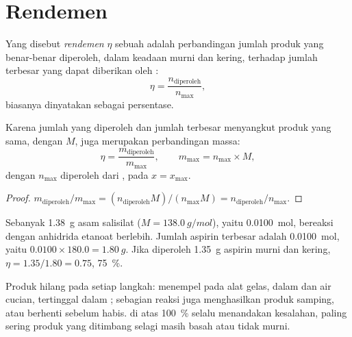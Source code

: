 \section{Rendemen}

\begin{definition}[Rendemen]\label{def:g10:synthesis-yield:yield}
Yang disebut \emph{rendemen} $\eta$ sebuah 
adalah perbandingan jumlah produk yang benar-benar diperoleh, dalam
keadaan murni dan kering, terhadap jumlah terbesar yang dapat diberikan
oleh :
\[
  \eta = \frac{n_{\text{diperoleh}}}{n_{\max}} ,
\]
biasanya dinyatakan sebagai persentase.
\end{definition}

\begin{proposition}\label{prop:g10:synthesis-yield:masses}
Karena jumlah yang diperoleh dan jumlah terbesar menyangkut produk yang
sama, dengan  $M$,  juga merupakan perbandingan
massa:
\[
  \eta = \frac{m_{\text{diperoleh}}}{m_{\max}},
  \qquad m_{\max} = n_{\max} \times M,
\]
dengan $n_{\max}$ diperoleh dari , pada $x = x_{\max}$.
\end{proposition}

\begin{proof}
$m_{\text{diperoleh}} / m_{\max} = (n_{\text{diperoleh}} M) / (n_{\max} M)
= n_{\text{diperoleh}} / n_{\max}$.
\end{proof}

\begin{example}\label{ex:g10:synthesis-yield:small}
Sebanyak \qty{1.38}{g} asam salisilat ($M = \qty{138.0}{g/mol}$), yaitu
\qty{0.0100}{mol}, bereaksi dengan anhidrida etanoat berlebih. Jumlah
aspirin terbesar adalah \qty{0.0100}{mol}, yaitu
$0.0100 \times 180.0 = \qty{1.80}{g}$. Jika diperoleh \qty{1.35}{g}
aspirin murni dan kering, $\eta = 1.35 / 1.80 = 0.75$, 
\qty{75}{\percent}.
\end{example}

\begin{remark}\label{rem:g10:synthesis-yield:below}
Produk hilang pada setiap langkah: menempel pada alat gelas,  dalam
 dan air cucian, tertinggal dalam ; sebagian reaksi
juga menghasilkan produk samping, atau berhenti sebelum  habis.  di atas \qty{100}{\percent} selalu menandakan
kesalahan, paling sering produk yang ditimbang selagi masih basah atau
tidak murni.
\end{remark}

